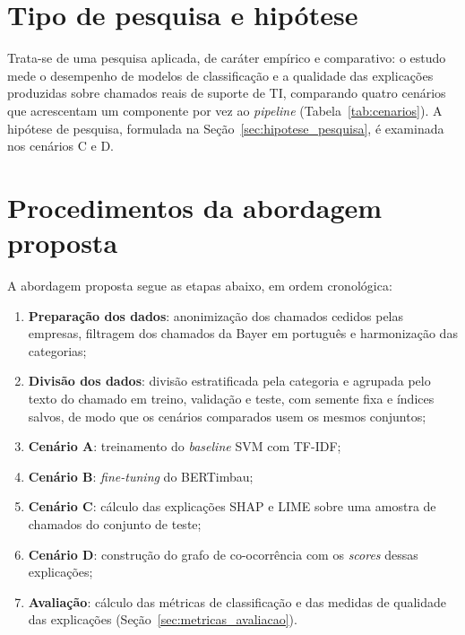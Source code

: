 \documentclass[
    12pt,                %
    openright,           %
    oneside,             %
    a4paper,             %
    english,             %
    brazil               %
]{abntex2}
\begin{document}
\section{Tipo de pesquisa e hipótese}
\label{sec:tipo_pesquisa}
Trata-se de uma pesquisa aplicada, de caráter empírico e comparativo: o estudo mede o desempenho 
de modelos de classificação e a qualidade das explicações produzidas sobre chamados reais de suporte de TI, 
comparando quatro cenários que acrescentam um componente por vez ao \textit{pipeline} (Tabela~\ref{tab:cenarios}). 
A hipótese de pesquisa, formulada na Seção~\ref{sec:hipotese_pesquisa}, é examinada nos cenários C e D.

\section{Procedimentos da abordagem proposta}
\label{sec:procedimentos}

A abordagem proposta segue as etapas abaixo, em ordem cronológica:

\begin{enumerate}
    \item \textbf{Preparação dos dados}: anonimização dos chamados cedidos pelas empresas, filtragem dos chamados da Bayer em português e harmonização das categorias;

    \item \textbf{Divisão dos dados}: divisão estratificada pela categoria e agrupada pelo texto do chamado em treino, validação e teste, com semente fixa e índices salvos, 
    de modo que os cenários comparados usem os mesmos conjuntos;

    \item \textbf{Cenário A}: treinamento do \textit{baseline} SVM com TF-IDF;

    \item \textbf{Cenário B}: \textit{fine-tuning} do BERTimbau;

    \item \textbf{Cenário C}: cálculo das explicações SHAP e LIME sobre uma amostra de chamados do conjunto de teste;

    \item \textbf{Cenário D}: construção do grafo de co-ocorrência com os \textit{scores} dessas explicações;

    \item \textbf{Avaliação}: cálculo das métricas de classificação e das medidas de 
    qualidade das explicações (Seção~\ref{sec:metricas_avaliacao}).
\end{enumerate}
\end{document}
